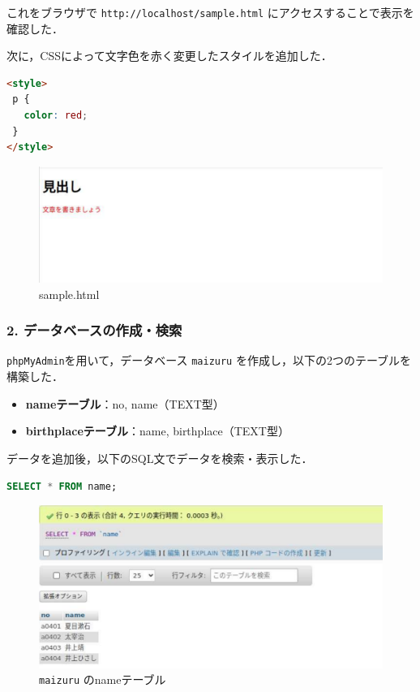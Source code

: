 これをブラウザで \texttt{http://localhost/sample.html} にアクセスすることで表示を確認した．

次に，CSSによって文字色を赤く変更したスタイルを追加した．

\begin{lstlisting}[language=html]
<style>
 p {
   color: red;
 }
</style>
\end{lstlisting}

\begin{figure}[htbp]
  \centering
  \includegraphics[width=0.9\linewidth]{figure/2.pdf}
  \caption{sample.html}
\end{figure}

\subsubsection*{2. データベースの作成・検索}

\texttt{phpMyAdmin}を用いて，データベース \texttt{maizuru} を作成し，以下の2つのテーブルを構築した．

\vspace{0.5zh}
\begin{itemize}
  \item \textbf{nameテーブル}：no, name（TEXT型）
  \item \textbf{birthplaceテーブル}：name, birthplace（TEXT型）
\end{itemize}

データを追加後，以下のSQL文でデータを検索・表示した．

\begin{lstlisting}[language=SQL]
SELECT * FROM name;
\end{lstlisting}

\begin{figure}[htbp]
  \centering
  \includegraphics[width=0.9\linewidth]{figure/3.pdf}
  \caption{\texttt{maizuru} のnameテーブル}
\end{figure}

